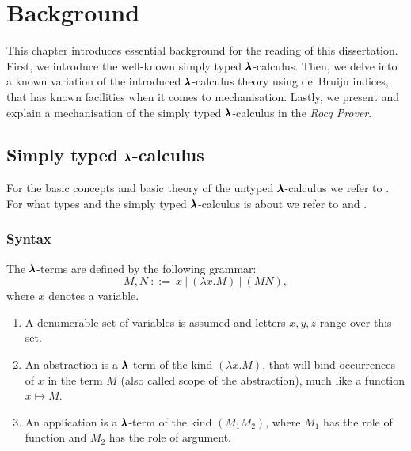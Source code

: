 \chapter{Background}
\label{c:background}




This chapter introduces essential background for the reading of this dissertation.
First, we introduce the well-known simply typed $\pmb{\lambda}$-calculus.
Then, we delve into a known variation of the introduced $\pmb{\lambda}$-calculus theory using de~Bruijn indices, that has known facilities when it comes to mechanisation.
Lastly, we present and explain a mechanisation of the simply typed $\pmb{\lambda}$-calculus in the \textit{Rocq Prover}.

\section{Simply typed $\pmb{\lambda}$-calculus}

For the basic concepts and basic theory of the untyped $\pmb{\lambda}$-calculus we refer to \cite{Barendregt1987}.
For what types and the simply typed $\pmb{\lambda}$-calculus is about we refer to \cite{Barendregt2013} and \cite{Hindley1997}.

\subsection{Syntax}

\begin{definition}
  The $\pmb{\lambda}$-terms are defined by the following grammar:
  \[ M, N \ ::= \ x \ | \ (\lambda x . M) \ | \ (M N) , \]
  where $x$ denotes a variable.
\end{definition}

\begin{remark} \hfill
  \begin{enumerate}
  \item A denumerable set of variables is assumed and letters $x, y, z$ range over this set.
  \item An abstraction is a $\pmb{\lambda}$-term of the kind $(\lambda x. M)$, that will bind occurrences of $x$ in the term $M$ (also called scope of the abstraction), much like a function $x \mapsto M$.
  \item An application is a $\pmb{\lambda}$-term of the kind $(M_1 M_2)$, where $M_1$ has the role of function and $M_2$ has the role of argument.
  \end{enumerate}
\end{remark}

